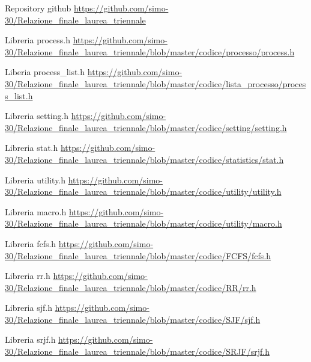 \documentclass[Lau, oneside]{sapthesis}%
\begin{document}
\backmatter
{}
\begin{thebibliography}{17}

\label{ref:repo}
Repository github \url{https://github.com/simo-30/Relazione_finale_laurea_triennale}

\label{ref:proch}
Libreria process.h \url{https://github.com/simo-30/Relazione_finale_laurea_triennale/blob/master/codice/processo/process.h}

\label{ref:listproch}
Liberia process\_list.h \url{https://github.com/simo-30/Relazione_finale_laurea_triennale/blob/master/codice/lista_processo/process_list.h}

\label{ref:settingh}
Libreria setting.h \url{https://github.com/simo-30/Relazione_finale_laurea_triennale/blob/master/codice/setting/setting.h}

\label{ref:stath}
Libreria stat.h \url{https://github.com/simo-30/Relazione_finale_laurea_triennale/blob/master/codice/statistics/stat.h}

\label{ref:utilityh}
Libreria utility.h \url{https://github.com/simo-30/Relazione_finale_laurea_triennale/blob/master/codice/utility/utility.h}

\label{ref:macroh}
Libreria macro.h \url{https://github.com/simo-30/Relazione_finale_laurea_triennale/blob/master/codice/utility/macro.h}

\label{ref:fcfsh}
Libreria fcfs.h \url{https://github.com/simo-30/Relazione_finale_laurea_triennale/blob/master/codice/FCFS/fcfs.h}

\label{ref:rrh}
Libreria rr.h \url{https://github.com/simo-30/Relazione_finale_laurea_triennale/blob/master/codice/RR/rr.h}

\label{ref:sjfh}
Libreria sjf.h \url{https://github.com/simo-30/Relazione_finale_laurea_triennale/blob/master/codice/SJF/sjf.h}

\label{ref:srjfh}
Libreria srjf.h \url{https://github.com/simo-30/Relazione_finale_laurea_triennale/blob/master/codice/SRJF/srjf.h}

\end{thebibliography}
\end{document}
